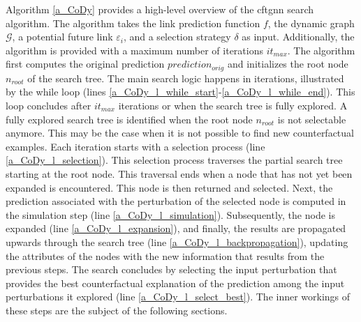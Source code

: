 Algorithm \ref{a_CoDy} provides a high-level overview of the \gls{cftgnn} search algorithm. The algorithm takes the link prediction function $f$, the dynamic graph $\mathcal{G}$, a potential future link $\varepsilon_i$, and a selection strategy $\delta$ as input. Additionally, the algorithm is provided with a maximum number of iterations $it_{max}$. The algorithm first computes the original prediction $prediction_{orig}$ and initializes the root node $n_{root}$ of the search tree. The main search logic happens in iterations, illustrated by the while loop (lines \ref{a_CoDy_l_while_start}-\ref{a_CoDy_l_while_end}). This loop concludes after $it_{max}$ iterations or when the search tree is fully explored. A fully explored search tree is identified when the root node $n_{root}$ is not selectable anymore. This may be the case when it is not possible to find new counterfactual examples. Each iteration starts with a selection process (line \ref{a_CoDy_l_selection}). This selection process traverses the partial search tree starting at the root node. This traversal ends when a node that has not yet been expanded is encountered. This node is then returned and selected. Next, the prediction associated with the perturbation of the selected node is computed in the simulation step (line \ref{a_CoDy_l_simulation}). Subsequently, the node is expanded (line \ref{a_CoDy_l_expansion}), and finally, the results are propagated upwards through the search tree (line \ref{a_CoDy_l_backpropagation}), updating the attributes of the nodes with the new information that results from the previous steps. The search concludes by selecting the input perturbation that provides the best counterfactual explanation of the prediction among the input perturbations it explored (line \ref{a_CoDy_l_select_best}). The inner workings of these steps are the subject of the following sections.


